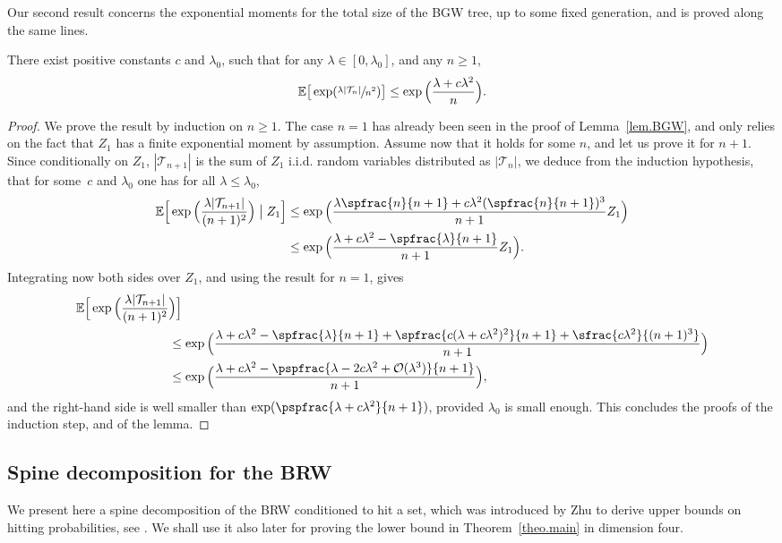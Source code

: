 Our second result concerns the exponential moments for the total size of the BGW tree, up to some fixed generation, and is proved along the same lines.
\begin{lemma}\label{lem.BGW2}
There exist positive constants $c$ and $\lambda_0$, such that for any $\lambda\in[0,\lambda_0]$, and any $n\ge 1$,
\begin{equation*}
\mathbb E\big[\exp(\sfrac{\lambda |\mathcal T_n|}{n^2})\big] \le \exp\Big(\frac{\lambda+c\lambda^2}{n}\Big).
\end{equation*}
\end{lemma}
\begin{proof}
We prove the result by induction on $n\ge 1$. The case $n=1$ has already been seen in the proof of Lemma~\ref{lem.BGW},
and only relies on the fact that $Z_1$ has a finite exponential moment by assumption. Assume now that it holds for some $n$, and let us prove
it for $n+1$. Since conditionally on $Z_1$, $|\mathcal T_{n+1}|$ is the sum of $Z_1$ i.i.d. random variables distributed as $|\mathcal T_{n}|$, we deduce from the induction hypothesis, that for some~$c$ and $\lambda_0$ one has for all $\lambda\le \lambda_0$,
\begin{align*}
\mathbb E\Big[\exp\Big(\frac{\lambda |\mathcal T_{n+1}|}{(n+1)^2}\Big)\bigm| Z_1\Big]
&\le \exp\Big(\frac{\lambda\spfrac{n}{n+1}+c\lambda^2(\spfrac{n}{n+1})^3}{n+1}Z_1\Big)\\
&\le \exp\Big(\frac{\lambda+c\lambda^2 - \spfrac{\lambda}{n+1} }{n+1}Z_1\Big).
\end{align*}
Integrating now both sides over $Z_1$, and using the result for $n=1$, gives
\begin{align*}
\mathbb E\Big[\exp\Big(\frac{\lambda |\mathcal T_{n+1}|}{(n+1)^2}&\Big)\Big]\\
&\le \exp\Big(\frac{\lambda+c\lambda^2 - \spfrac{\lambda}{n+1}+\spfrac{c(\lambda + c\lambda^2)^2}{n+1} +\sfrac{c\lambda^2}{(n+1)^3}}{n+1}\Big)\\
&\le \exp\Big(\frac{\lambda+c\lambda^2 - \pspfrac{\lambda - 2c\lambda^2+ \mathcal O(\lambda^3)}{n+1} }{n+1} \Big),
\end{align*}
and the right-hand side is well smaller than $\exp(\pspfrac{\lambda + c\lambda^2}{n+1})$, provided $\lambda_0$ is small enough.
This concludes the proofs of the induction step, and of the lemma.
\end{proof}

\subsection{Spine decomposition for the BRW}
We present here a spine decomposition of the BRW conditioned to hit a set, which was introduced by Zhu to derive upper bounds on hitting probabilities, see \cite{Zhu1, Zhu3}. We shall
use it also later for proving the lower bound in Theorem~\ref{theo.main}
in dimension four.

